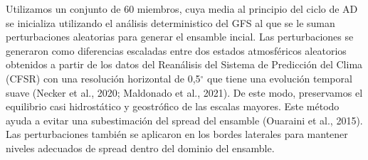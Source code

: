 \documentclass[12pt,oneside]{reedthesis}
\begin{document}
Utilizamos un conjunto de 60 miembros, cuya media al principio del ciclo de AD se inicializa utilizando el análisis deterministico del GFS al que se le suman perturbaciones aleatorias para generar el ensamble incial. Las perturbaciones se generaron como diferencias escaladas entre dos estados atmosféricos aleatorios obtenidos a partir de los datos del Reanálisis del Sistema de Predicción del Clima (CFSR) con una resolución horizontal de 0,5\(^{\circ}\) que tiene una evolución temporal suave (Necker et al., 2020; Maldonado et al., 2021). De este modo, preservamos el equilibrio casi hidrostático y geostrófico de las escalas mayores. Este método ayuda a evitar una subestimación del spread del ensamble (Ouaraini et al., 2015). Las perturbaciones también se aplicaron en los bordes laterales para mantener niveles adecuados de spread dentro del dominio del ensamble.
\end{document}
